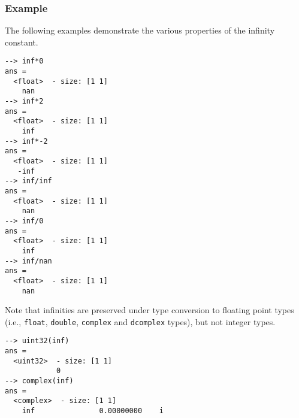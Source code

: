 \subsubsection{Example}
The following examples demonstrate the various properties of the infinity constant.
\begin{verbatim}
--> inf*0
ans =
  <float>  - size: [1 1]
    nan
--> inf*2
ans =
  <float>  - size: [1 1]
    inf
--> inf*-2
ans =
  <float>  - size: [1 1]
   -inf
--> inf/inf
ans =
  <float>  - size: [1 1]
    nan
--> inf/0
ans =
  <float>  - size: [1 1]
    inf
--> inf/nan
ans =
  <float>  - size: [1 1]
    nan
\end{verbatim}
Note that infinities are preserved under type conversion to floating point types (i.e., \verb|float|, \verb|double|, \verb|complex| and \verb|dcomplex| types), but not integer  types.
\begin{verbatim}
--> uint32(inf)
ans =
  <uint32>  - size: [1 1]
            0
--> complex(inf)
ans =
  <complex>  - size: [1 1]
    inf               0.00000000    i
\end{verbatim}

